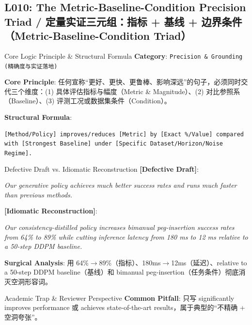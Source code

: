 \subsection{L010: The Metric-Baseline-Condition Precision Triad / 定量实证三元组：指标 + 基线 + 边界条件（Metric-Baseline-Condition Triad）}\label{sec:logic:L010}
\begin{ConceptBox}{Core Logic Principle \& Structural Formula}
\textbf{Category}: \texttt{Precision \& Grounding (精确度与实证落地)}\par\vspace{3pt}
\textbf{Core Principle}: 任何宣称“更好、更快、更鲁棒、影响深远”的句子，必须同时交代三个维度：(1)  具体评估指标与幅度（Metric \& Magnitude）、(2)  对比参照系（Baseline）、(3)  评测工况或数据集条件（Condition）。\par\vspace{4pt}
\textbf{Structural Formula}:\par\noindent\texttt{[Method/Policy] improves/reduces [Metric] by [Exact \%/Value] compared with [Strongest Baseline] under [Specific Dataset/Horizon/Noise Regime].}
\end{ConceptBox}
\begin{ExampleBox}{Defective Draft vs. Idiomatic Reconstruction}
\textbf{\color{TargetHighlight}[Defective Draft]}:\par\textit{Our generative policy achieves much better success rates and runs much faster than previous methods.}\par\vspace{4pt}
\textbf{\color{AcadNavy}[Idiomatic Reconstruction]}:\par\textit{Our consistency-distilled policy increases bimanual peg-insertion success rates from 64\% to 89\% while cutting inference latency from 180 ms to 12 ms relative to a 50-step DDPM baseline.}\par\vspace{4pt}
\textbf{Surgical Analysis}: 用 64\%$\to$89\%（指标）、180ms$\to$12ms（延迟）、relative to a 50-step DDPM baseline（基线）和 bimanual peg-insertion（任务条件）彻底消灭空洞形容词。
\end{ExampleBox}
\begin{TipBox}{Academic Trap \& Reviewer Perspective}
\textbf{Common Pitfall}: 只写 significantly improves performance 或 achieves state-of-the-art results，属于典型的“不精确 + 空洞夸张”。
\end{TipBox}
\vspace{6pt}
